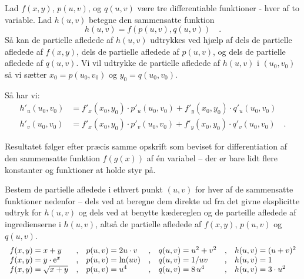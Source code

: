 \begin{theorem} \label{thmChain2VarA}
Lad $f(x,y)$, $p(u,v)$, og $q(u,v)$ være tre differentiable funktioner - hver af to variable.
Lad $h(u,v)$ betegne den sammensatte funktion
\begin{equation}
h(u,v) = f(p(u,v), q(u,v)) \quad .
 \end{equation}
Så kan de partielle afledede af $h(u,v)$ udtrykkes ved hjælp af dels de partielle afledede af $f(x,y)$, dels de partielle afledede af $p(u,v)$, og dels de partielle afledede af $q(u,v)$. Vi vil udtrykke de partielle afledede af $h(u,v)$ i $(u_{0}, v_{0})$ så vi sætter $x_{0}= p(u_{0},v_{0})$ og $y_{0}= q(u_{0},v_{0})$.

 Så har vi:
\begin{equation}
\begin{aligned}
h'_{u}(u_{0},v_{0}) &=  f'_{x}(x_{0}, y_{0})\cdot p'_{u}(u_{0}, v_{0}) + f'_{y}(x_{0}, y_{0})\cdot q'_{u}(u_{0}, v_{0})\\
h'_{v}(u_{0},v_{0}) &=  f'_{x}(x_{0}, y_{0})\cdot p'_{v}(u_{0}, v_{0}) + f'_{y}(x_{0}, y_{0})\cdot q'_{v}(u_{0}, v_{0}) \quad .
\end{aligned}
\end{equation}
\end{theorem}
\begin{bevis}
Resultatet følger efter præcis samme opskrift som beviset for differentiation af den sammensatte funktion $f(g(x))$ af \'{e}n variabel -- der er bare lidt flere konstanter og funktioner at holde styr på.
\end{bevis}



\begin{exercise}
Bestem de partielle afledede i ethvert punkt $(u,v)$ for hver af de sammensatte funktioner nedenfor -- dels ved at beregne dem direkte ud fra det givne eksplicitte udtryk for $h(u,v)$ og dels ved at benytte kædereglen og de parteille afledede af ingredienserne i $h(u,v)$, altså de partielle afledede af $f(x,y)$, $p(u,v)$ og $q(u,v)$.
\begin{equation}
\begin{array}{lllllll}
  f(x,y) = x+y & , & p(u,v) = 2u \cdot v  & , & q(u,v)= u^{2} + v^{2}& , & h(u,v) = (u + v)^{2}\\
  f(x,y) = y\cdot\mathrm{e}^{x} & , & p(u,v) = \ln(uv) & , & q(u,v)= 1/uv & , & h(u,v) = 1 \\
  f(x,y) = \sqrt{x + y} & , & p(u,v) = u^{4} & , & q(u,v)= 8\,u^{4}& , & h(u,v) = 3\cdot u^2\\
\end{array}
\end{equation}
\end{exercise}



